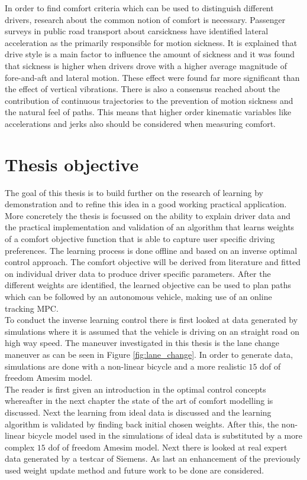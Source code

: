 In order to find comfort criteria which can be used to distinguish different drivers, research about the common notion of comfort is necessary. Passenger surveys in public road transport about carsickness \cite{Turner1999} have identified lateral acceleration as the primarily responsible for motion sickness. It is explained that drive style is a main factor to influence the amount of sickness and it was found that sickness is higher when drivers drove with a higher average magnitude of fore-and-aft and lateral motion. These effect were found far more significant than the effect of vertical vibrations. There is also a consensus reached about the contribution of continuous trajectories to the prevention of motion sickness and the natural feel of paths.\cite{Elbanhawi2015} This means that higher order kinematic variables like accelerations and jerks also should be considered when measuring comfort.\\

\section{Thesis objective}
The goal of this thesis is to build further on the research of learning by demonstration \cite{Kuderer2015a} and to refine this idea in a good working practical application. More concretely the thesis is focussed on the ability to explain driver data and the practical implementation and validation of an algorithm that learns weights of a comfort objective function that is able to capture user specific driving preferences. The learning process is done offline and based on an inverse optimal control approach. The comfort objective will be derived from literature and fitted on individual driver data to produce driver specific parameters. After the different weights are identified, the learned objective can be used to plan paths which can be followed by an autonomous vehicle, making use of an online tracking MPC.\\


To conduct the inverse learning control there is first looked at data generated by simulations where it is assumed that the vehicle is driving on an straight road on high way speed. The maneuver investigated in this thesis is the lane change maneuver as can be seen in Figure \ref{fig:lane_change}. In order to generate data, simulations are done with a non-linear bicycle and a more realistic $15$ dof of freedom Amesim model.\\
The reader is first given an introduction in the optimal control concepts whereafter in the next chapter the state of the art of comfort modelling is discussed. Next the learning from ideal data is discussed and the learning algorithm is validated by finding back initial chosen weights. After this, the non-linear bicycle model used in the simulations of ideal data is substituted by a more complex $15$ dof of freedom Amesim model. Next there is looked at real expert data generated by a testcar of Siemens. As last an enhancement of the previously used weight update method and future work to be done are considered.


